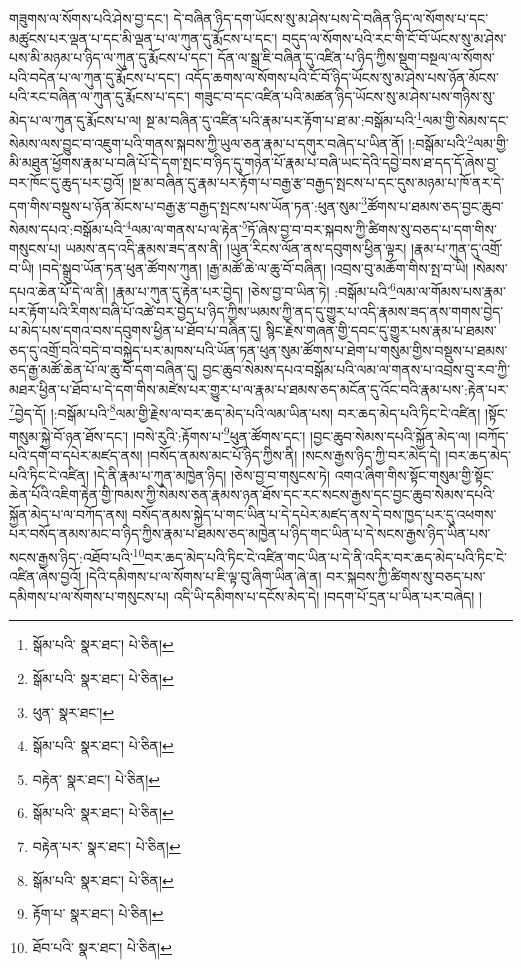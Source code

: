 གཟུགས་ལ་སོགས་པའི་ཤེས་བྱ་དང་། དེ་བཞིན་ཉིད་དག་ཡོངས་སུ་མ་ཤེས་པས་དེ་བཞིན་ཉིད་ལ་སོགས་པ་དང་མཚུངས་པར་ལྡན་པ་དང་མི་ལྡན་པ་ལ་ཀུན་དུ་རྨོངས་པ་དང་། བདུད་ལ་སོགས་པའི་རང་གི་ངོ་བོ་ཡོངས་སུ་མ་ཤེས་པས་མི་མཉམ་པ་ཉིད་ལ་ཀུན་དུ་རྨོངས་པ་དང་། དོན་ལ་སྒྲ་ཇི་བཞིན་དུ་འཛིན་པ་ཉིད་ཀྱིས་སྡུག་བསྔལ་ལ་སོགས་པའི་བདེན་པ་ལ་ཀུན་དུ་རྨོངས་པ་དང་། འདོད་ཆགས་ལ་སོགས་པའི་ངོ་བོ་ཉིད་ཡོངས་སུ་མ་ཤེས་པས་ཉོན་མོངས་པའི་རང་བཞིན་ལ་ཀུན་དུ་རྨོངས་པ་དང་། གཟུང་བ་དང་འཛིན་པའི་མཚན་ཉིད་ཡོངས་སུ་མ་ཤེས་པས་གཉིས་སུ་མེད་པ་ལ་ཀུན་དུ་རྨོངས་པ་ལ། སྔ་མ་བཞིན་དུ་འཛིན་པའི་རྣམ་པར་རྟོག་པ་ཐ་མ་:བསྒོམ་པའི་\footnote{སྒོམ་པའི་  སྣར་ཐང་།  པེ་ཅིན། }ལམ་གྱི་སེམས་དང་སེམས་ལས་བྱུང་བ་འཇུག་པའི་གནས་སྐབས་ཀྱི་ཡུལ་ཅན་རྣམ་པ་དགུར་བཞེད་པ་ཡིན་ནོ། །:བསྒོམ་པའི་\footnote{སྒོམ་པའི་  སྣར་ཐང་།  པེ་ཅིན། }ལམ་གྱི་མི་མཐུན་ཕྱོགས་རྣམ་པ་བཞི་པོ་དེ་དག་སྤང་བ་ཉིད་དུ་གཉེན་པོ་རྣམ་པ་བཞི་ཡང་དེའི་དབྱེ་བས་ཐ་དད་དོ་ཞེས་བྱ་བར་ཁོང་དུ་ཆུད་པར་བྱའོ། །སྔ་མ་བཞིན་དུ་རྣམ་པར་རྟོག་པ་བརྒྱ་རྩ་བརྒྱད་སྤངས་པ་དང་དུས་མཉམ་པ་ཁོ་ནར་དེ་དག་གིས་བསྡུས་པ་ཉོན་མོངས་པ་བརྒྱ་རྩ་བརྒྱད་སྤངས་པས་ཡོན་ཏན་:ཕུན་སུམ་\footnote{ཕུན་  སྣར་ཐང་། }ཚོགས་པ་ཐམས་ཅད་བྱང་ཆུབ་སེམས་དཔའ་:བསྒོམ་པའི་\footnote{སྒོམ་པའི་  སྣར་ཐང་།  པེ་ཅིན། }ལམ་ལ་གནས་པ་ལ་རྟེན་\footnote{བརྟེན་  སྣར་ཐང་།  པེ་ཅིན། }ཏོ་ཞེས་བྱ་བ་བར་སྐབས་ཀྱི་ཚིགས་སུ་བཅད་པ་དག་གིས་གསུངས་པ། ཡམས་ནད་འདི་རྣམས་ཟད་ནས་ནི། །ཡུན་རིངས་ལོན་ནས་དབུགས་ཕྱིན་ལྟར། །རྣམ་པ་ཀུན་དུ་འགྲོ་བ་ཡི། །བདེ་སྒྲུབ་ཡོན་ཏན་ཕུན་ཚོགས་ཀུན། །རྒྱ་མཚོ་ཆེ་ལ་ཆུ་བོ་བཞིན། །འབྲས་བུ་མཆོག་གིས་སྤ་བ་ཡི། །སེམས་དཔའ་ཆེན་པོ་དེ་ལ་ནི། །རྣམ་པ་ཀུན་དུ་རྟེན་པར་བྱེད། །ཅེས་བྱ་བ་ཡིན་ཏེ། :བསྒོམ་པའི་\footnote{སྒོམ་པའི་  སྣར་ཐང་།  པེ་ཅིན། }ལམ་ལ་གོམས་པས་རྣམ་པར་རྟོག་པའི་རིགས་བཞི་པོ་འཚེ་བར་བྱེད་པ་ཉིད་ཀྱིས་ཡམས་ཀྱི་ནད་དུ་གྱུར་པ་འདི་རྣམས་ཟད་ནས་གགས་བྱེད་པ་མེད་པས་དགའ་བས་དབུགས་ཕྱིན་པ་ཐོབ་པ་བཞིན་དུ། སྙིང་རྗེས་གཞན་གྱི་དབང་དུ་གྱུར་པས་རྣམ་པ་ཐམས་ཅད་དུ་འགྲོ་བའི་བདེ་བ་བསྐྱེད་པར་མཁས་པའི་ཡོན་ཏན་ཕུན་སུམ་ཚོགས་པ་ཐེག་པ་གསུམ་གྱིས་བསྡུས་པ་ཐམས་ཅད་རྒྱ་མཚོ་ཆེན་པོ་ལ་ཆུ་བོ་དག་བཞིན་དུ། བྱང་ཆུབ་སེམས་དཔའ་བསྒོམ་པའི་ལམ་ལ་གནས་པ་འབྲས་བུ་རབ་ཀྱི་མཐར་ཕྱིན་པ་ཐོབ་པ་དེ་དག་གིས་མཛེས་པར་གྱུར་པ་ལ་རྣམ་པ་ཐམས་ཅད་མངོན་དུ་འོང་བའི་རྣམ་པས་:རྟེན་པར་\footnote{བརྟེན་པར་  སྣར་ཐང་།  པེ་ཅིན། }བྱེད་དོ། །:བསྒོམ་པའི་\footnote{སྒོམ་པའི་  སྣར་ཐང་།  པེ་ཅིན། }ལམ་གྱི་རྗེས་ལ་བར་ཆད་མེད་པའི་ལམ་ཡིན་པས། བར་ཆད་མེད་པའི་ཏིང་ངེ་འཛིན། །སྟོང་གསུམ་སྐྱེ་བོ་ཉན་ཐོས་དང་། །བསེ་རུའི་:རྟོགས་པ་\footnote{རྟོག་པ་  སྣར་ཐང་།  པེ་ཅིན། }ཕུན་ཚོགས་དང་། །བྱང་ཆུབ་སེམས་དཔའི་སྐྱོན་མེད་ལ། །བཀོད་པའི་དགེ་བ་དཔེར་མཛད་ནས། །བསོད་ནམས་མང་པོ་ཉིད་ཀྱིས་ནི། །སངས་རྒྱས་ཉིད་ཀྱི་བར་མེད་དེ། །བར་ཆད་མེད་པའི་ཏིང་ངེ་འཛིན། །དེ་ནི་རྣམ་པ་ཀུན་མཁྱེན་ཉིད། །ཅེས་བྱ་བ་གསུངས་ཏེ། འགའ་ཞིག་གིས་སྟོང་གསུམ་གྱི་སྟོང་ཆེན་པོའི་འཇིག་རྟེན་གྱི་ཁམས་ཀྱི་སེམས་ཅན་རྣམས་ཉན་ཐོས་དང་རང་སངས་རྒྱས་དང་བྱང་ཆུབ་སེམས་དཔའི་སྐྱོན་མེད་པ་ལ་བཀོད་ནས། བསོད་ནམས་སྐྱེད་པ་གང་ཡིན་པ་དེ་དཔེར་མཛད་ནས་དེ་བས་ཁྱད་པར་དུ་འཕགས་པར་བསོད་ནམས་མང་བ་ཉིད་ཀྱིས་རྣམ་པ་ཐམས་ཅད་མཁྱེན་པ་ཉིད་གང་ཡིན་པ་དེ་སངས་རྒྱས་ཉིད་ཡིན་པས་སངས་རྒྱས་ཉིད་:འཐོབ་པའི་\footnote{ཐོབ་པའི་  སྣར་ཐང་།  པེ་ཅིན། }བར་ཆད་མེད་པའི་ཏིང་ངེ་འཛིན་གང་ཡིན་པ་དེ་ནི་འདིར་བར་ཆད་མེད་པའི་ཏིང་ངེ་འཛིན་ཞེས་བྱའོ། །དེའི་དམིགས་པ་ལ་སོགས་པ་ཇི་ལྟ་བུ་ཞིག་ཡིན་ཞེ་ན། བར་སྐབས་ཀྱི་ཚིགས་སུ་བཅད་པས་དམིགས་པ་ལ་སོགས་པ་གསུངས་པ། འདི་ཡི་དམིགས་པ་དངོས་མེད་དེ། །བདག་པོ་དྲན་པ་ཡིན་པར་བཞེད། །
